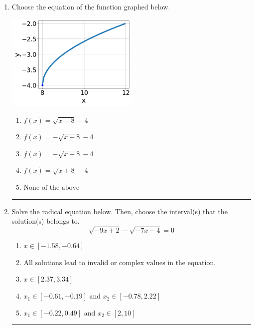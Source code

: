 \documentclass[14pt]{extbook}
\newcommand{\litem}[1]{\item#1\hspace*{-1cm}\rule{\textwidth}{0.4pt}}
\begin{document}
\begin{enumerate}
{\begin{enumerate}[label=\Alph*.]
\end{enumerate} }
\litem{
Choose the equation of the function graphed below.
\begin{center}
    \includegraphics[width=0.5\textwidth]{../Figures/radicalGraphToEquationC.png}
\end{center}
\begin{enumerate}[label=\Alph*.]
\item \( f(x) = \sqrt{x - 8} - 4 \)
\item \( f(x) = - \sqrt{x + 8} - 4 \)
\item \( f(x) = - \sqrt{x - 8} - 4 \)
\item \( f(x) = \sqrt{x + 8} - 4 \)
\item \( \text{None of the above} \)

\end{enumerate} }
\litem{
Solve the radical equation below. Then, choose the interval(s) that the solution(s) belongs to.\[ \sqrt{-9 x + 2} - \sqrt{-7 x - 4} = 0 \]\begin{enumerate}[label=\Alph*.]
\item \( x \in [-1.58,-0.64] \)
\item \( \text{All solutions lead to invalid or complex values in the equation.} \)
\item \( x \in [2.37,3.34] \)
\item \( x_1 \in [-0.61, -0.19] \text{ and } x_2 \in [-0.78,2.22] \)
\item \( x_1 \in [-0.22, 0.49] \text{ and } x_2 \in [2,10] \)

\end{enumerate} }
\end{enumerate}
\end{document}
